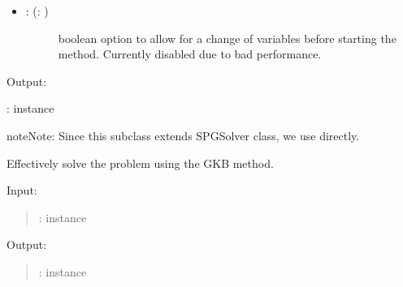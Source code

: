 \documentclass[a4paper,10pt,english]{sphinxmanual}
\begin{document}
\begin{fulllineitems}
\begin{description}
\begin{itemize}
\begin{description}
\end{description}

\item {} \begin{description}
\item[{: (: )}] \leavevmode
boolean option to allow for a change of variables before starting the 
method. Currently disabled due to bad performance.

\end{description}

\end{itemize}

\end{description}

Output:

:  instance

\begin{sphinxadmonition}{note}{Note:}
Since this subclass extends SPGSolver class, we use 
 directly.
\end{sphinxadmonition}

\begin{fulllineitems}
\label{\detokenize{skprocrustes:skprocrustes.GKBSolver.solve}}
Effectively solve the problem using the GKB method.

Input:
\begin{quote}

:  instance
\end{quote}

Output:
\begin{quote}

:  instance
\end{quote}

\end{fulllineitems}


\end{fulllineitems}

\end{document}
